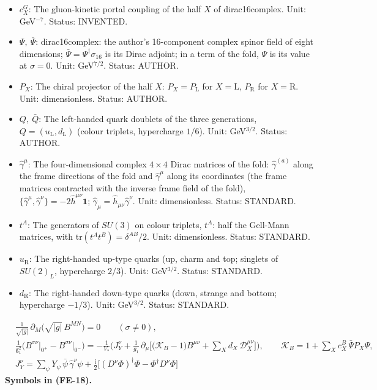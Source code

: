 \documentclass[
  10pt,
]{article}
\begin{document}
\begin{itemize}
  \(X \in \{\mathrm{L}, \mathrm{R}\}\) (left-handed or right-handed
  half); a sum over \(X\) runs over both. Status: STANDARD.
\item
  \(c^{G}_X\): The gluon-kinetic portal coupling of the half \(X\) of
  dirac16complex. Unit: GeV\(^{-7}\). Status: INVENTED.
\item
  \(\Psi,\ \bar\Psi\): dirac16complex: the author's 16-component complex
  spinor field of eight dimensions;
  \(\bar\Psi = \Psi^\dagger\sigma_{16}\) is its Dirac adjoint; in a term
  of the fold, \(\Psi\) is its value at \(\sigma = 0\). Unit:
  GeV\(^{7/2}\). Status: AUTHOR.
\item
  \(P_X\): The chiral projector of the half \(X\):
  \(P_X = P_{\mathrm{L}}\) for \(X = \mathrm{L}\), \(P_{\mathrm{R}}\)
  for \(X = \mathrm{R}\). Unit: dimensionless. Status: AUTHOR.
\item
  \(Q,\ \bar Q\): The left-handed quark doublets of the three
  generations, \(Q = (u_{\mathrm{L}}, d_{\mathrm{L}})\) (colour
  triplets, hypercharge \(1/6\)). Unit: GeV\(^{3/2}\). Status: AUTHOR.
\item
  \(\hat\gamma^\mu\): The four-dimensional complex \(4 \times 4\) Dirac
  matrices of the fold: \(\hat\gamma^{(a)}\) along the frame directions
  of the fold and \(\hat\gamma^\mu\) along its coordinates (the frame
  matrices contracted with the inverse frame field of the fold),
  \(\{\hat\gamma^\mu, \hat\gamma^\nu\} = -2\hat h^{\mu\nu}\mathbf{1}\);
  \(\hat\gamma_\mu = \hat h_{\mu\nu}\hat\gamma^\nu\). Unit:
  dimensionless. Status: STANDARD.
\item
  \(t^A\): The generators of \(SU(3)\) on colour triplets, \(t^A\): half
  the Gell-Mann matrices, with \(\mathrm{tr}(t^At^B) = \delta^{AB}/2\).
  Unit: dimensionless. Status: STANDARD.
\item
  \(u_{\mathrm{R}}\): The right-handed up-type quarks (up, charm and
  top; singlets of \(SU(2)_L\), hypercharge \(2/3\)). Unit:
  GeV\(^{3/2}\). Status: STANDARD.
\item
  \(d_{\mathrm{R}}\): The right-handed down-type quarks (down, strange
  and bottom; hypercharge \(-1/3\)). Unit: GeV\(^{3/2}\). Status:
  STANDARD.
\end{itemize}

\[
\begin{aligned}
&\frac{1}{\sqrt{\lvert g\rvert}}\,\partial_M\big(\sqrt{\lvert g\rvert}\,B^{MN}\big) = 0\qquad (\sigma \ne 0),\\
&\frac{1}{\mathsf{g}_1^2}\Big(B^{\sigma\nu}\big\vert_{0^+} - B^{\sigma\nu}\big\vert_{0^-}\Big)
 = -\frac{1}{V_*}\Big(J_Y^\nu + \frac{1}{g_1}\,\partial_\mu\Big[\big(\mathcal{K}_{B} - 1\big)B^{\mu\nu} + \sum_X d_X\,\mathcal{D}_X^{\mu\nu}\Big]\Big),\qquad
 \mathcal{K}_{B} = 1 + \sum_X c^{B}_X\,\bar\Psi P_X\Psi,\\
&J_Y^\nu = \sum_\psi Y_\psi\,\bar\psi\,\hat\gamma^\nu\psi + \frac{\mathrm{i}}{2}\big[(D^\nu\Phi)^\dagger\Phi - \Phi^\dagger D^\nu\Phi\big]
\end{aligned} \tag{FE-18}
\] \textbf{Symbols in (FE-18).}
\end{document}
